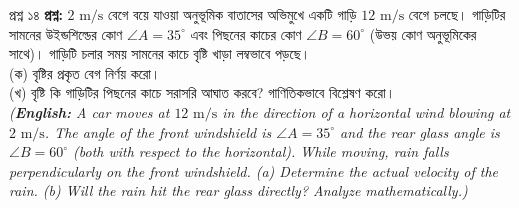 \documentclass[11pt,a4paper]{article}
\begin{document}
\begin{qbox}{প্রশ্ন ১৪}
\textbf{প্রশ্ন:} $2\text{ m/s}$ বেগে বয়ে যাওয়া অনুভূমিক বাতাসের অভিমুখে একটি গাড়ি $12\text{ m/s}$ বেগে চলছে। গাড়িটির সামনের উইন্ডশিল্ডের কোণ $\angle A = 35^\circ$ এবং পিছনের কাচের কোণ $\angle B = 60^\circ$ (উভয় কোণ অনুভূমিকের সাথে)। গাড়িটি চলার সময় সামনের কাচে বৃষ্টি খাড়া লম্বভাবে পড়ছে। \\
(ক) বৃষ্টির প্রকৃত বেগ নির্ণয় করো। \\
(খ) বৃষ্টি কি গাড়িটির পিছনের কাচে সরাসরি আঘাত করবে? গাণিতিকভাবে বিশ্লেষণ করো। \\
\textit{(\textbf{English:} A car moves at $12\text{ m/s}$ in the direction of a horizontal wind blowing at $2\text{ m/s}$. The angle of the front windshield is $\angle A = 35^\circ$ and the rear glass angle is $\angle B = 60^\circ$ (both with respect to the horizontal). While moving, rain falls perpendicularly on the front windshield. (a) Determine the actual velocity of the rain. (b) Will the rain hit the rear glass directly? Analyze mathematically.)}
\end{qbox}
\end{document}
